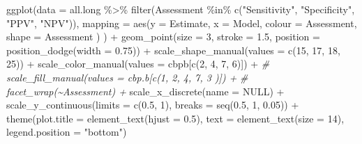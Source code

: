 \documentclass[
]{article}
\newenvironment{Shaded}{\begin{snugshade}}{\end{snugshade}}
\newcommand{\AttributeTok}[1]{\textcolor[rgb]{0.77,0.63,0.00}{#1}}
\newcommand{\CommentTok}[1]{\textcolor[rgb]{0.56,0.35,0.01}{\textit{#1}}}
\newcommand{\ConstantTok}[1]{\textcolor[rgb]{0.00,0.00,0.00}{#1}}
\newcommand{\DecValTok}[1]{\textcolor[rgb]{0.00,0.00,0.81}{#1}}
\newcommand{\FloatTok}[1]{\textcolor[rgb]{0.00,0.00,0.81}{#1}}
\newcommand{\FunctionTok}[1]{\textcolor[rgb]{0.00,0.00,0.00}{#1}}
\newcommand{\NormalTok}[1]{#1}
\newcommand{\SpecialCharTok}[1]{\textcolor[rgb]{0.00,0.00,0.00}{#1}}
\newcommand{\StringTok}[1]{\textcolor[rgb]{0.31,0.60,0.02}{#1}}
\begin{document}
\begin{Shaded}
\begin{Highlighting}[]
\FunctionTok{ggplot}\NormalTok{(}\AttributeTok{data =}\NormalTok{ all.long }\SpecialCharTok{\%\textgreater{}\%} 
         \FunctionTok{filter}\NormalTok{(Assessment }\SpecialCharTok{\%in\%} \FunctionTok{c}\NormalTok{(}\StringTok{"Sensitivity"}\NormalTok{, }\StringTok{"Specificity"}\NormalTok{, }\StringTok{"PPV"}\NormalTok{, }\StringTok{"NPV"}\NormalTok{)),}
       \AttributeTok{mapping =} \FunctionTok{aes}\NormalTok{(}\AttributeTok{y =}\NormalTok{ Estimate,}
                     \AttributeTok{x =}\NormalTok{ Model, }
                     \AttributeTok{colour =}\NormalTok{ Assessment,}
                     \AttributeTok{shape =}\NormalTok{ Assessment}
\NormalTok{                     )}
\NormalTok{       ) }\SpecialCharTok{+}
  \FunctionTok{geom\_point}\NormalTok{(}\AttributeTok{size =} \DecValTok{3}\NormalTok{, }\AttributeTok{stroke =} \FloatTok{1.5}\NormalTok{,}
             \AttributeTok{position =} \FunctionTok{position\_dodge}\NormalTok{(}\AttributeTok{width =} \FloatTok{0.75}\NormalTok{)) }\SpecialCharTok{+}
  \FunctionTok{scale\_shape\_manual}\NormalTok{(}\AttributeTok{values =} \FunctionTok{c}\NormalTok{(}\DecValTok{15}\NormalTok{, }\DecValTok{17}\NormalTok{, }\DecValTok{18}\NormalTok{, }\DecValTok{25}\NormalTok{)) }\SpecialCharTok{+}
  \FunctionTok{scale\_color\_manual}\NormalTok{(}\AttributeTok{values =}\NormalTok{ cbpb[}\FunctionTok{c}\NormalTok{(}\DecValTok{2}\NormalTok{, }\DecValTok{4}\NormalTok{, }\DecValTok{7}\NormalTok{, }\DecValTok{6}\NormalTok{)]) }\SpecialCharTok{+}
  \CommentTok{\# scale\_fill\_manual(values = cbp.b[c(1, 2, 4, 7, 3 )]) +}
  \CommentTok{\# facet\_wrap(\textasciitilde{}Assessment) +}
  \FunctionTok{scale\_x\_discrete}\NormalTok{(}\AttributeTok{name =} \ConstantTok{NULL}\NormalTok{) }\SpecialCharTok{+}
  \FunctionTok{scale\_y\_continuous}\NormalTok{(}\AttributeTok{limits =} \FunctionTok{c}\NormalTok{(}\FloatTok{0.5}\NormalTok{, }\DecValTok{1}\NormalTok{),}
                     \AttributeTok{breaks =} \FunctionTok{seq}\NormalTok{(}\FloatTok{0.5}\NormalTok{, }\DecValTok{1}\NormalTok{, }\FloatTok{0.05}\NormalTok{)) }\SpecialCharTok{+}
  \FunctionTok{theme}\NormalTok{(}\AttributeTok{plot.title =} \FunctionTok{element\_text}\NormalTok{(}\AttributeTok{hjust =} \FloatTok{0.5}\NormalTok{), }
        \AttributeTok{text =} \FunctionTok{element\_text}\NormalTok{(}\AttributeTok{size =} \DecValTok{14}\NormalTok{),}
        \AttributeTok{legend.position =} \StringTok{"bottom"}\NormalTok{)}
\end{Highlighting}
\end{Shaded}
\end{document}
